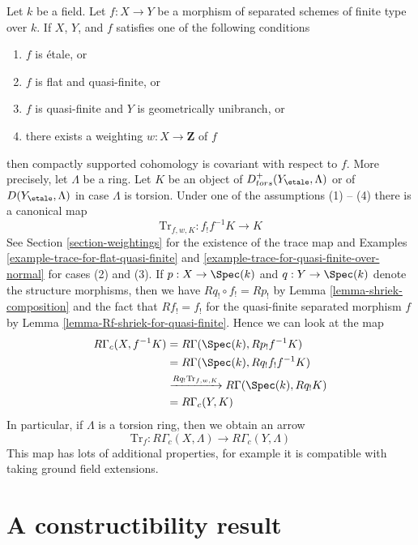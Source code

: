 \begin{remark}
\label{remark-covariance-compactly-supported}
Let $k$ be a field. Let $f : X \to Y$ be a morphism of separated
schemes of finite type over $k$. If $X$, $Y$, and $f$ satisfies one
of the following conditions
\begin{enumerate}
\item $f$ is \'etale, or
\item $f$ is flat and quasi-finite, or
\item $f$ is quasi-finite and $Y$ is geometrically unibranch, or
\item there exists a weighting $w : X \to \mathbf{Z}$ of $f$
\end{enumerate}
then compactly supported cohomology is covariant with respect to $f$.
More precisely, let $\Lambda$ be a ring. Let $K$ be an object of
$D^+_{tors}(Y_\etale, \Lambda)$ or of $D(Y_\etale, \Lambda)$ in case
$\Lambda$ is torsion. Under one of the assumptions (1) -- (4)
there is a canonical map
$$
\text{Tr}_{f, w, K} : f_!f^{-1}K \longrightarrow K
$$
See Section \ref{section-weightings} for the existence of the
trace map and Examples \ref{example-trace-for-flat-quasi-finite} and
\ref{example-trace-for-quasi-finite-over-normal} for cases (2) and (3).
If $p : X \to \Spec(k)$ and $q : Y \to \Spec(k)$ denote
the structure morphisms, then we have $Rq_! \circ f_! = Rp_!$
by Lemma \ref{lemma-shriek-composition} and the fact that
$Rf_! = f_!$ for the quasi-finite separated morphism $f$ by
Lemma \ref{lemma-Rf-shriek-for-quasi-finite}. Hence we can look
at the map
\begin{align*}
R\Gamma_c(X, f^{-1}K)
& =
R\Gamma(\Spec(k), Rp_!f^{-1}K) \\
& =
R\Gamma(\Spec(k), Rq_!f_!f^{-1}K) \\
& \xrightarrow{Rq_!\text{Tr}_{f, w, K}}
R\Gamma(\Spec(k), Rq_!K) \\
& =
R\Gamma_c(Y, K)
\end{align*}
In particular, if $\Lambda$ is a torsion ring, then we obtain an arrow
$$
\text{Tr}_f : R\Gamma_c(X, \Lambda) \longrightarrow R\Gamma_c(Y, \Lambda)
$$
This map has lots of additional properties, for example it is
compatible with taking ground field extensions.
\end{remark}










\section{A constructibility result}
\label{section-family-smooth-curves-cohomology}

